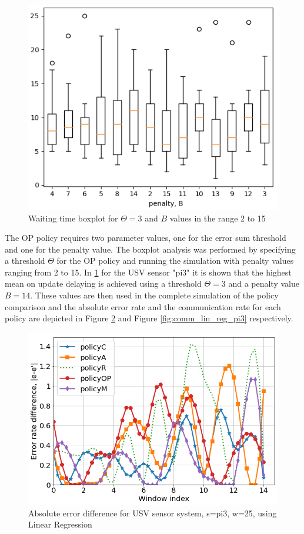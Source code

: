 \documentclass{mpaper}
\begin{document}
\begin{figure}[h]
    \centering
    \includegraphics[scale=0.4]{imgs/boxplot_linreg_waiting_pi3.png}
    \caption{Waiting time boxplot for $\Theta=3$ and $B$ values in the range 2 to 15}
    \label{fig:boxplot_linreg}
\end{figure}

The OP policy requires two parameter values, one for the error sum threshold and one for the penalty value. The boxplot analysis was performed by specifying a threshold $\Theta$ for the OP policy and running the simulation with penalty values ranging from 2 to 15. 
In \ref{fig:boxplot_linreg} for the USV sensor "pi3" it is shown that the highest mean on update delaying is achieved using a threshold $\Theta = 3$ and a penalty value $B=14$.
These values are then used in the complete simulation of the policy comparison and the absolute error rate and the communication rate for each policy are depicted in Figure \ref{fig:err_lin_reg_pi3} and Figure \ref{fig:comm_lin_reg_pi3} respectively.

\begin{figure}[h]
    \centering
    \includegraphics[scale=0.33]{imgs/lin_reg_pi3_w25.png}
    \caption{Absolute error difference for USV sensor system, s=pi3, w=25, using Linear Regression}
    \label{fig:err_lin_reg_pi3}
\end{figure}
\end{document}
